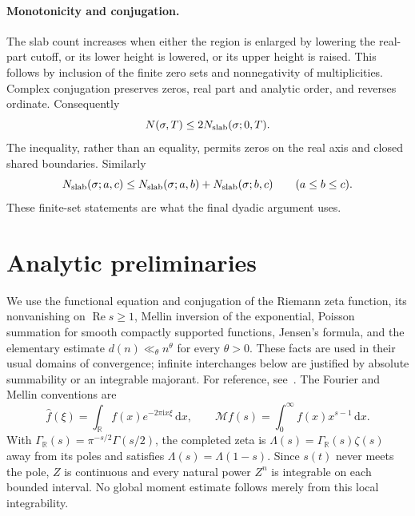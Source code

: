\documentclass[11pt,a4paper]{article}
\numberwithin{equation}{section}
\theoremstyle{definition}
\newcommand{\R}{\mathbb R}
\newcommand{\dd}{\,\mathrm d}
\newcommand{\ii}{\mathrm i}
\newcommand{\Rea}{\operatorname{Re}}
\newcommand{\Mell}{\mathcal M}
\begin{document}
\paragraph{Monotonicity and conjugation.}
The slab count increases when either the region is enlarged by lowering the
real-part cutoff, or its lower height is lowered, or its upper height is raised.
This follows by inclusion of the finite zero sets and nonnegativity of
multiplicities. Complex conjugation preserves zeros, real part and analytic
order, and reverses ordinate. Consequently
\[
 N(\sigma,T)\le2N_{\rm slab}(\sigma;0,T).
\]
The inequality, rather than an equality, permits zeros on the real axis and
closed shared boundaries. Similarly
\[
 N_{\rm slab}(\sigma;a,c)\le
 N_{\rm slab}(\sigma;a,b)+N_{\rm slab}(\sigma;b,c)
 \qquad(a\le b\le c).
\]
These finite-set statements are what the final dyadic argument uses.


\section{Analytic preliminaries}\label{sec:foundations}
We use the functional equation and conjugation of the Riemann zeta function,
its nonvanishing on $\Rea s\ge1$, Mellin inversion of the exponential,
Poisson summation for smooth compactly supported functions, Jensen's
formula, and the elementary estimate $d(n)\ll_\theta n^\theta$
for every $\theta>0$. These facts are used in their usual domains of
convergence; infinite interchanges below are justified by absolute
summability or an integrable majorant. For reference, see~\cite{ivic,ik,titchmarsh}.
The Fourier and Mellin conventions are
\[
 \widehat f(\xi)=\int_\R f(x)e^{-2\pi\ii x\xi}\dd x,
 \qquad \Mell f(s)=\int_0^\infty f(x)x^{s-1}\dd x.
\]
With $\Gamma_\R(s)=\pi^{-s/2}\Gamma(s/2)$, the completed zeta is
$\Lambda(s)=\Gamma_\R(s)\zeta(s)$ away from its poles and satisfies
$\Lambda(s)=\Lambda(1-s)$. Since $s(t)$ never meets the pole,
$Z$ is continuous and every natural power $Z^n$ is integrable on each
bounded interval. No global moment estimate follows merely from this
local integrability.
\end{document}
